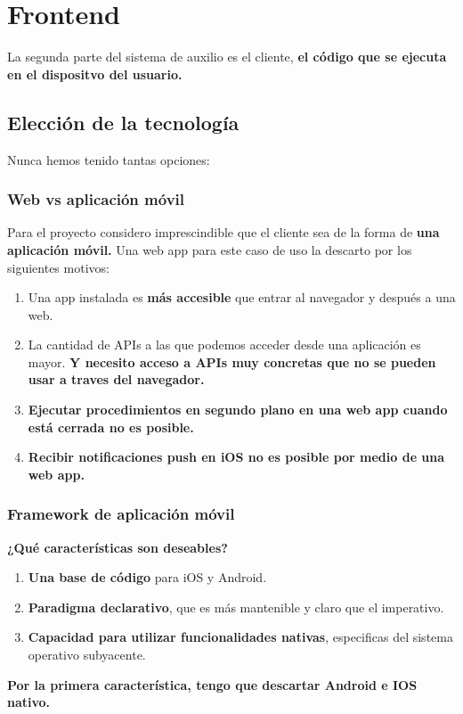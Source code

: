 \chapter{Frontend}
La segunda parte del sistema de auxilio es el cliente, \textbf{el código que se ejecuta en el dispositvo del usuario.}
\section{Elección de la tecnología}
Nunca hemos tenido tantas opciones:
\subsection{Web vs aplicación móvil}
Para el proyecto considero imprescindible que el cliente sea de la forma de \textbf{una aplicación móvil.} 
Una web app para este caso de uso la descarto por los siguientes motivos:
\begin{enumerate}
  \item Una app instalada es \textbf{más accesible} que entrar al navegador y después a una web.
  \item La cantidad de APIs a las que podemos acceder desde una aplicación es mayor. \textbf{Y necesito acceso a APIs muy concretas que no se pueden usar a traves del navegador.}
	\item \textbf{Ejecutar procedimientos en segundo plano en una web app cuando está cerrada no es posible.}
	\item \textbf{Recibir notificaciones push en iOS no es posible por medio de una web app.}
\end{enumerate}

\subsection{Framework de aplicación móvil}

\textbf{¿Qué características son deseables?}

\begin{enumerate}
  \item \textbf{Una base de código} para iOS y Android.
  \item \textbf{Paradigma declarativo}, que es más mantenible y claro que el imperativo.
  \item \textbf{Capacidad para utilizar funcionalidades nativas}, especificas del sistema operativo subyacente.
\end{enumerate}

\textbf{Por la primera característica, tengo que descartar Android e IOS nativo.} \\

